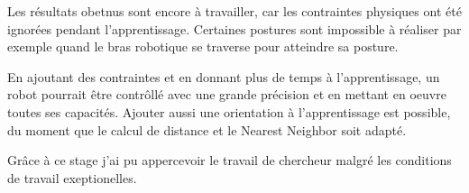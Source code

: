 \documentclass[11pt,french]{report}
\begin{document}
Les résultats obetnus sont encore à travailler, car les contraintes physiques ont été ignorées pendant l'apprentissage.
Certaines postures sont impossible à réaliser par exemple quand le bras robotique se traverse pour atteindre sa posture.

En ajoutant des contraintes et en donnant plus de temps à l'apprentissage, un robot pourrait être contrôllé avec une grande précision et en mettant en oeuvre toutes ses capacités.
Ajouter aussi une orientation à l'apprentissage est possible, du moment que le calcul de distance et le Nearest Neighbor soit adapté.

\phantom{INVISIBLE LINE}

Grâce à ce stage j'ai pu appercevoir le travail de chercheur malgré les conditions de travail exeptionelles.




\end{document}
